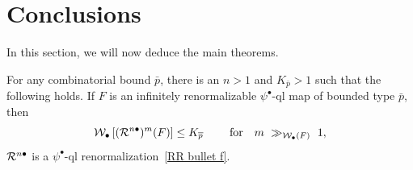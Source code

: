 \documentclass{amsart}
\renewcommand{\sp}{{\ \ }}
\newcommand{\1}{{\mathbb 1 }}
\newcommand{\Width}{{\mathcal W}}
\begin{document}
\section{Conclusions}\label{s:conclusions} In this section, we will now deduce the main theorems. 


\begin{thm}
\label{thm:psi bullet bounds}
For any combinatorial bound $\bar p$, there is an $n>1$ and $K_{\bar p}>1$ such that the following holds. If $F$ is an infinitely renormalizable $\psi^\bullet$-ql map of bounded type $\bar p$, then 
\[ \Width_\bullet \left[ (\RR^{n\bullet})^m (F)\right]\le K_{\overline p} \sp\sp\sp \text{ for }\sp m\ \gg_{\Width_\bullet(F)}\ 1,\] 
${\mathcal R}^{n \bullet}$ is a $\psi^\bullet$-ql renormalization~\eqref{RR bullet f}.
\end{thm} 
\end{document}
